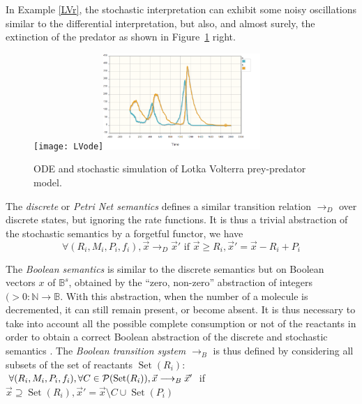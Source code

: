 \documentclass[graybox]{svmult}
\newcommand{\lra}{\longrightarrow}
\DeclareMathOperator{\Set}{Set}
\begin{document}
      In Example \ref{LVr}, the stochastic interpretation can exhibit some noisy oscillations similar to the differential interpretation,
      but also, and almost surely, the extinction of the predator as shown in Figure~\ref{LVsim} right.

\begin{figure}[htb]
\begin{center}
  \texttt{[image: LVode]}\includegraphics[width=0.53\textwidth]{LVstoch}
\end{center}
  \caption{ODE and stochastic simulation of Lotka Volterra prey-predator model.}\label{LVsim}
\end{figure}



      The \emph{discrete} or \emph{Petri Net semantics} defines a similar transition relation $\lra_D$
over discrete states, but ignoring the rate functions.
      It is thus a trivial abstraction of the stochastic semantics by a forgetful functor, we have
      $$\forall (R_i, M_i, P_i, f_i), {\vec x}\lra_D{\vec x'}\text{ if }      {\vec x}\geq R_i, {\vec x'} = {\vec x} - R_i + P_i$$

The \emph{Boolean semantics} is similar to the discrete semantics
but on Boolean vectors $x$ of $\mathbb{B}^s$,
obtained by the ``zero, non-zero'' abstraction of integers $(>0:\mathbb N\rightarrow\mathbb B$.
With this abstraction, when the number of a molecule is decremented,
it can still remain present, or become absent. It is thus necessary to take into account all the possible
complete consumption or not of the reactants in order to obtain a correct Boolean abstraction
of the discrete and stochastic semantics \cite{FS08tcs}. The \emph{Boolean transition system} $\lra_B$
is thus defined by considering all subsets of the set of reactants $\Set(R_i)$:\\

\noindent
$\forall (R_i, M_i, P_i, f_i), \forall C\in{\cal P}(\Set(R_i)), {\vec       x}\lra_B{\vec x'}$
if ${\vec x}\supseteq \Set(R_i), {\vec x'} =       {\vec x} \setminus C \cup \Set(P_i)$\\
\end{document}
